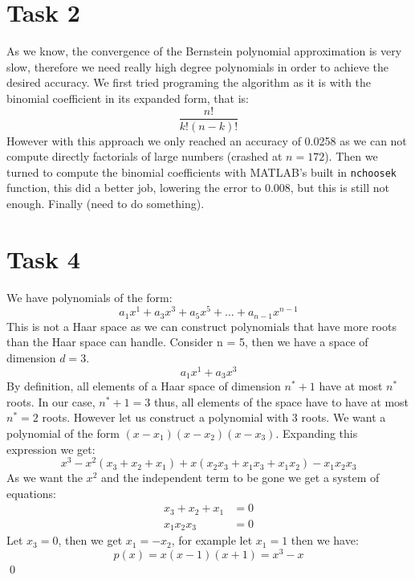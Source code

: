 

% 

\section*{Task 2}
As we know, the convergence of the Bernstein polynomial approximation is very slow, therefore we need really high degree polynomials in order to achieve the desired accuracy. We first tried programing the algorithm as it is with the binomial coefficient in its expanded form, that is:
\begin{equation*}
\frac{n!}{k!(n-k)!}
\end{equation*}
However with this approach we only reached an accuracy of 0.0258 as we can not compute directly factorials of large numbers (crashed at $n = 172$). Then we turned to compute the binomial coefficients with MATLAB's built in \texttt{nchoosek} function, this did a better job, lowering the error to 0.008, but this is still not enough. Finally (need to do something).

\section*{Task 4}
We have polynomials of the form:
\begin{equation*}
a_1x^1+a_3x^3+a_5x^5+\ldots+a_{n-1}x^{n-1}
\end{equation*}
This is not a Haar space as we can construct polynomials that have more roots than the Haar space can handle. Consider n = 5, then we have a space of dimension $d=3$.
\begin{equation*}
a_1x^1+a_3x^3
\end{equation*}
By definition, all elements of a Haar space of dimension $n^*+1$ have at most $n^*$ roots. In our case, $n^*+1 = 3$ thus, all elements of the space have to have at most $n^*=2$ roots. However let us construct a polynomial with 3 roots. We want a polynomial of the form $(x-x_1)(x-x_2)(x-x_3)$. Expanding this expression we get:
\begin{equation*}
x^3-x^2(x_3+x_2+x_1)+x(x_2x_3+x_1x_3+x_1x_2)-x_1x_2x_3
\end{equation*}
As we want the $x^2$ and the independent term to be gone we get a system of equations:
\begin{align*}
x_3+x_2+x_1 &= 0 \\
x_1x_2x_3 &= 0
\end{align*}
Let $x_3 = 0$, then we get $x_1 = -x_2$, for example let $x_1 = 1$ then we have:
\begin{equation*}
p(x) = x(x-1)(x+1) = x^3-x
\end{equation*}
\qed

